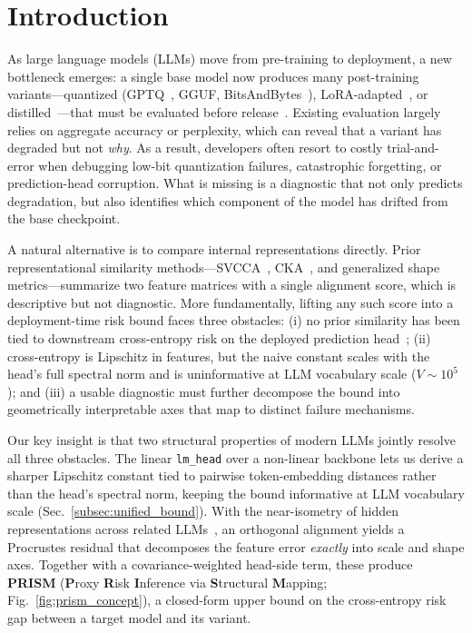 \section{Introduction}

As large language models (LLMs) move from pre-training to deployment, a new bottleneck emerges: a single base model now produces many post-training variants---quantized (GPTQ~\citep{frantar2022gptq}, GGUF, BitsAndBytes~\citep{dettmers2022gpt3}), LoRA-adapted~\citep{hu2022lora}, or distilled~\citep{hinton2015distilling}---that must be evaluated before release~\citep{grattafiori2024llama, qwen2025qwen3}. Existing evaluation largely relies on aggregate accuracy or perplexity, which can reveal that a variant has degraded but not \emph{why}. As a result, developers often resort to costly trial-and-error when debugging low-bit quantization failures, catastrophic forgetting, or prediction-head corruption. What is missing is a diagnostic that not only predicts degradation, but also identifies which component of the model has drifted from the base checkpoint.

A natural alternative is to compare internal representations directly. Prior representational similarity methods---SVCCA~\citep{raghu2017svcca}, CKA~\citep{kornblith2019similarity}, and generalized shape metrics---summarize two feature matrices with a single alignment score, which is descriptive but not diagnostic. More fundamentally, lifting any such score into a deployment-time risk bound faces three obstacles: (i) no prior similarity has been tied to downstream cross-entropy risk on the deployed prediction head~\citep{ding2021grounding, davari2023reliability, klabunde2023similarity}; (ii) cross-entropy is Lipschitz in features, but the naive constant scales with the head's full spectral norm and is uninformative at LLM vocabulary scale ($V\sim 10^5$); and (iii) a usable diagnostic must further decompose the bound into geometrically interpretable axes that map to distinct failure mechanisms.

Our key insight is that two structural properties of modern LLMs jointly resolve all three obstacles. The linear \texttt{lm\_head} over a non-linear backbone lets us derive a sharper Lipschitz constant tied to pairwise token-embedding distances rather than the head's spectral norm, keeping the bound informative at LLM vocabulary scale (Sec.~\ref{subsec:unified_bound}). With the near-isometry of hidden representations across related LLMs~\citep{park2023linear, moschella2022relative}, an orthogonal alignment yields a Procrustes residual that decomposes the feature error \emph{exactly} into scale and shape axes. Together with a covariance-weighted head-side term, these produce \textbf{PRISM} (\textbf{P}roxy \textbf{R}isk \textbf{I}nference via \textbf{S}tructural \textbf{M}apping; Fig.~\ref{fig:prism_concept}), a closed-form upper bound on the cross-entropy risk gap between a target model and its variant.

